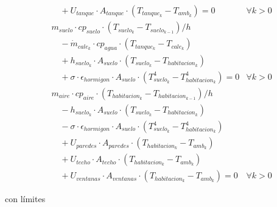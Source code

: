 \begin{align}
	                        & \quad + U_{tanque} \cdot A_{tanque} \cdot (T_{tanque_k} - T_{amb_k}) = 0  \label{eq:sizing_dae2}                 & \forall k > 0 \\
	                        & m_{suelo} \cdot cp_{suelo} \cdot ( T_{suelo_k} - T_{suelo_{k-1}}) / h \nonumber                                                  \\
	                        & \quad - \dot{m}_{cale_k} \cdot cp_{agua} \cdot (T_{tanque_k} - T_{cale_k})                             \nonumber                 \\
	                        & \quad + h_{suelo_k} \cdot A_{suelo} \cdot (T_{suelo_k} - T_{habitacion_k})                             \nonumber                 \\
	                        & \quad + \sigma \cdot \epsilon_{hormigon} \cdot A_{suelo} \cdot (T_{suelo_k}^4 - T_{habitacion_k}^4) = 0          & \forall k > 0 \\
	                        & m_{aire} \cdot cp_{aire} \cdot ( T_{habitacion_k} - T_{habitacion_{k-1}}) / h  \nonumber                                         \\
	                        & \quad - h_{suelo_k} \cdot A_{suelo} \cdot (T_{suelo_k} - T_{habitacion_k})  \nonumber                                            \\
	                        & \quad - \sigma \cdot \epsilon_{hormigon} \cdot A_{suelo} \cdot (T_{suelo_k}^4 - T_{habitacion_k}^4)  \nonumber                   \\
	                        & \quad + U_{paredes} \cdot A_{paredes} \cdot (T_{habitacion_k} - T_{amb_k}) \nonumber                                             \\
	                        & \quad + U_{techo} \cdot A_{techo} \cdot (T_{habitacion_k} - T_{amb_k}) \nonumber                                                 \\
	                        & \quad + U_{ventanas} \cdot A_{ventanas} \cdot (T_{habitacion_k} - T_{amb_k}) = 0                                 & \forall k > 0
\end{align}

con límites

